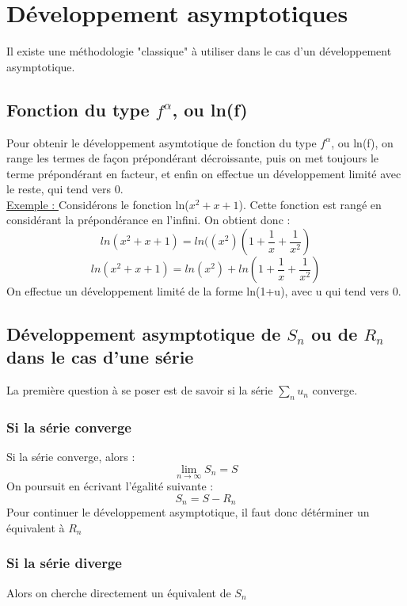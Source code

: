 \documentclass[a4paper,12 pt,oneside]{report}     %
\begin{document}
\chapter{Développement asymptotiques}
Il existe une méthodologie "classique" à utiliser dans le cas d'un développement asymptotique.
\section{Fonction du type $f^{\alpha}$, ou ln(f)}
Pour obtenir le développement asymtotique de fonction du type $f^{\alpha}$, ou ln(f), on range les termes de façon prépondérant décroissante, puis on met toujours le terme prépondérant en facteur, et enfin on effectue un développement limité avec le reste, qui tend vers 0.\\
\underline{Exemple : }
Considérons le fonction ln($x^2+x+1$). Cette fonction est rangé en considérant la prépondérance en l'infini. On obtient donc : 
$$ln(x^2+x+1) = ln((x^2)(1+\dfrac{1}{x}+\dfrac{1}{x^2})$$
$$ln(x^2+x+1) = ln(x^2) + ln(1+\dfrac{1}{x}+\dfrac{1}{x^2})$$
On effectue un développement limité de la forme ln(1+u), avec u qui tend vers 0.
\section{Développement asymptotique de $S_n$ ou de $R_n$ dans le cas d'une série}
La première question à se poser est de savoir si la série $\underset{n}\sum u_n$ converge.
\subsection{Si la série converge}
Si la série converge, alors :
$$\lim_{n\rightarrow \infty} S_n = S$$
On poursuit en écrivant l'égalité suivante : 
$$S_n = S - R_n$$
Pour continuer le développement asymptotique, il faut donc détérminer un équivalent à $R_n$
\subsection{Si la série diverge}
Alors on cherche directement un équivalent de $S_n$
\end{document}
